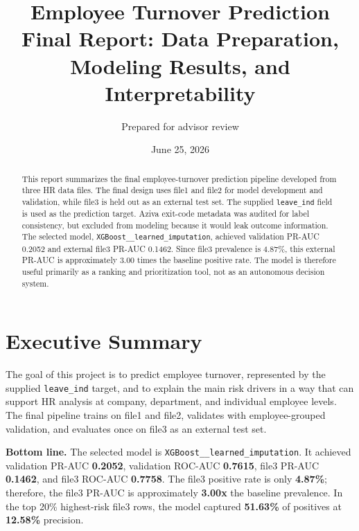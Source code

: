 \documentclass[11pt]{article}
\title{\textbf{Employee Turnover Prediction}\\
\large Final Report: Data Preparation, Modeling Results, and Interpretability}
\author{Prepared for advisor review}
\date{June 25, 2026}
\newcommand{\feature}[1]{\texttt{#1}}
\newcommand{\metric}[1]{\textbf{#1}}
\begin{document}
\maketitle

\begin{abstract}
This report summarizes the final employee-turnover prediction pipeline developed from three HR data files. The final design uses file1 and file2 for model development and validation, while file3 is held out as an external test set. The supplied \feature{leave\_ind} field is used as the prediction target. Aziva exit-code metadata was audited for label consistency, but excluded from modeling because it would leak outcome information. The selected model, \feature{XGBoost\_\_learned\_imputation}, achieved validation PR-AUC 0.2052 and external file3 PR-AUC 0.1462. Since file3 prevalence is 4.87\%, this external PR-AUC is approximately 3.00 times the baseline positive rate. The model is therefore useful primarily as a ranking and prioritization tool, not as an autonomous decision system.
\end{abstract}

\tableofcontents
\newpage

\section{Executive Summary}

The goal of this project is to predict employee turnover, represented by the supplied \feature{leave\_ind} target, and to explain the main risk drivers in a way that can support HR analysis at company, department, and individual employee levels. The final pipeline trains on file1 and file2, validates with employee-grouped validation, and evaluates once on file3 as an external test set.

\textbf{Bottom line.} The selected model is \feature{XGBoost\_\_learned\_imputation}. It achieved validation PR-AUC \metric{0.2052}, validation ROC-AUC \metric{0.7615}, file3 PR-AUC \metric{0.1462}, and file3 ROC-AUC \metric{0.7758}. The file3 positive rate is only \metric{4.87\%}; therefore, the file3 PR-AUC is approximately \metric{3.00x} the baseline prevalence. In the top 20\% highest-risk file3 rows, the model captured \metric{51.63\%} of positives at \metric{12.58\%} precision.
\end{document}
